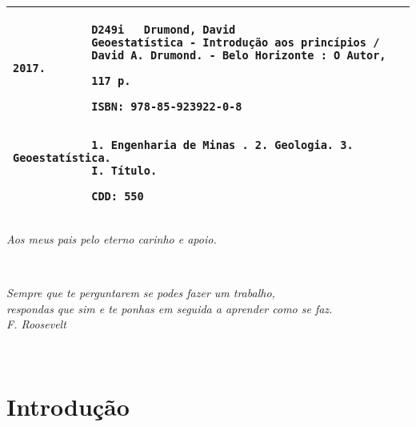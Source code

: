 \documentclass[11pt,fleqn]{book} %
\begin{document}
\begin{center}
	\begin{tabular}{|p{12.5cm}|}%
		\hline
		\begin{small}
			\begin{verbatim}
			D249i	Drumond, David
			Geoestatística - Introdução aos princípios / 
			David A. Drumond. - Belo Horizonte : O Autor, 2017. 
			117 p. 
			
			ISBN: 978-85-923922-0-8
			
			
			1. Engenharia de Minas . 2. Geologia. 3. Geoestatística.
			I. Título.
		
			CDD: 550
			\end{verbatim}
		\end{small}
		\\ \hline
	\end{tabular}
\end{center}
\setcounter{page}{2} %

\newpage
\thispagestyle{empty}
\vspace*{\fill}

{ \raggedleft
	
	
	\textit{Aos meus pais pelo eterno carinho e apoio.}
	
	~
}


\newpage
\thispagestyle{empty}
\vspace*{\fill}

{ \raggedleft
	
	
	\textit{Sempre que te perguntarem se podes fazer um trabalho, \\
		respondas que sim e te ponhas em seguida a aprender como se faz. \\
		F. Roosevelt}
	
	~
}



\newpage
\section{Introdução}
\end{document}
